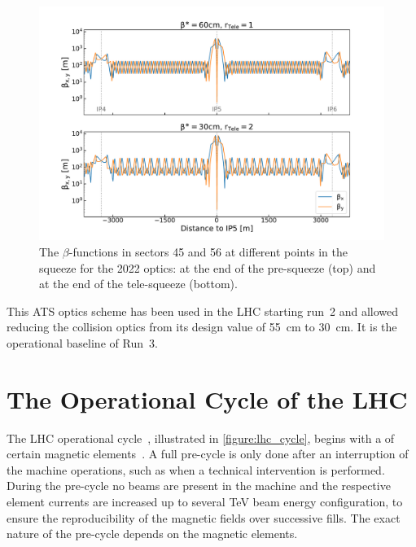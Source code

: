\begin{figure}[!hbt]
  \centering
  \includegraphics*[width=0.96\linewidth]{Figures/Optics_Measurements_Corrections_at_LHC/lhc_ats_wave.pdf}
  \caption{The \(\beta\)-functions in sectors \num{45} and \num{56} at different points in the squeeze for the \num{2022} optics: at the end of the pre-squeeze (top) and at the end of the tele-squeeze (bottom).}
  \label{figure:lhc_ats_scheme}
\end{figure}

This ATS optics scheme has been used in the LHC starting \Gls{run}~\num{2} and allowed reducing the collision optics  from its design value of \qty{55}{\centi\meter} to \qty{30}{\centi\meter}.
It is the operational baseline of Run~\num{3}.

\section{The Operational Cycle of the LHC}
\label{section:lhc_operational_cycle}

The \gls{LHC} operational cycle~\cite{Report:LHCModes}, illustrated in \cref{figure:lhc_cycle}, begins with a  of certain magnetic elements~\cite{Report:LHCMagnetsPreCycles}.
A full pre-cycle is only done after an interruption of the machine operations, such as when a technical intervention is performed.
During the pre-cycle no beams are present in the machine and the respective element currents are increased up to several \unit{\tera\electronvolt} beam energy configuration, to ensure the reproducibility of the magnetic fields over successive fills.
The exact nature of the pre-cycle depends on the magnetic elements.%

